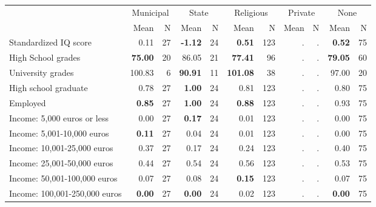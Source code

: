 \begin{tabular}{l r r r r r r r r r r}
\toprule
& \multicolumn{2}{c}{Municipal} & \multicolumn{2}{c}{State} & \multicolumn{2}{c}{Religious} & \multicolumn{2}{c}{Private} & \multicolumn{2}{c}{None} \\
& \scriptsize Mean & \scriptsize N & \scriptsize Mean & \scriptsize N & \scriptsize Mean & \scriptsize N & \scriptsize Mean & \scriptsize N & \scriptsize Mean & \scriptsize N \\
\midrule
Standardized IQ score &      0.11 &        27 & \textbf{    -1.12} &        24 & \textbf{     0.51} &       123 &         . & . & \textbf{     0.52} &        75 \\
High School grades & \textbf{    75.00} &        20 &     86.05 &        21 & \textbf{    77.41} &        96 &         . & . & \textbf{    79.05} &        60 \\
University grades &    100.83 &         6 & \textbf{    90.91} &        11 & \textbf{   101.08} &        38 &         . & . &     97.00 &        20 \\
High school graduate &      0.78 &        27 & \textbf{     1.00} &        24 &      0.81 &       123 &         . & . &      0.80 &        75 \\
Employed & \textbf{     0.85} &        27 & \textbf{     1.00} &        24 & \textbf{     0.88} &       123 &         . & . &      0.93 &        75 \\
Income: 5,000 euros or less &      0.00 &        27 & \textbf{     0.17} &        24 &      0.01 &       123 &         . & . &      0.00 &        75 \\
Income: 5,001-10,000 euros & \textbf{     0.11} &        27 &      0.04 &        24 &      0.01 &       123 &         . & . &      0.00 &        75 \\
Income: 10,001-25,000 euros &      0.37 &        27 &      0.17 &        24 &      0.24 &       123 &         . & . &      0.40 &        75 \\
Income: 25,001-50,000 euros &      0.44 &        27 &      0.54 &        24 &      0.56 &       123 &         . & . &      0.53 &        75 \\
Income: 50,001-100,000 euros &      0.07 &        27 &      0.08 &        24 & \textbf{     0.15} &       123 &         . & . &      0.07 &        75 \\
Income: 100,001-250,000 euros & \textbf{     0.00} &        27 & \textbf{     0.00} &        24 &      0.02 &       123 &         . & . & \textbf{     0.00} &        75 \\

\end{tabular}
